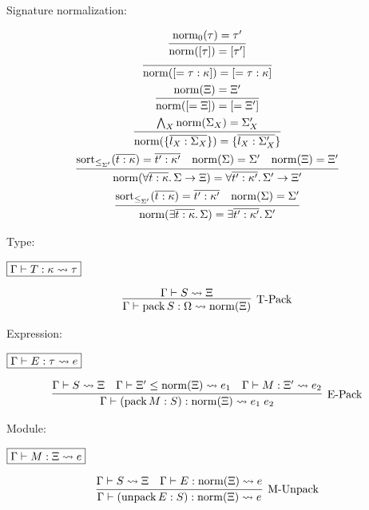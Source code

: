 Signature normalization:

\begin{gather*}
  \infer{\symnorm([\tau]) = [\tau']}{
    \symnorm_0(\tau) = \tau'
  }
  \\
  \infer{\symnorm([= \tau: \kappa]) = [= \tau: \kappa]}{}
  \\
  \infer{\symnorm([= \Xi]) = [= \Xi']}{
    \symnorm(\Xi) = \Xi'
  }
  \\
  \infer{\symnorm(\{\overline{l_X: \Sigma_X}\}) = \{\overline{l_X: \Sigma_X'}\}}{
    \bigwedge_X \symnorm(\Sigma_X) = \Sigma_X'
  }
  \\
  \infer{\symnorm(\forall \overline{t: \kappa}\ldotp \Sigma \to \Xi) = \forall \overline{t': \kappa'}\ldotp \Sigma' \to \Xi'}{
    \symsort_{\leq_{\Sigma'}}(\overline{t: \kappa}) = \overline{t': \kappa'}
    &
    \symnorm(\Sigma) = \Sigma'
    &
    \symnorm(\Xi) = \Xi'
  }
  \\
  \infer{\symnorm(\exists \overline{t: \kappa}\ldotp \Sigma) = \exists \overline{t': \kappa'}\ldotp \Sigma'}{
    \symsort_{\leq_{\Sigma'}}(\overline{t: \kappa}) = \overline{t': \kappa'}
    &
    \symnorm(\Sigma) = \Sigma'
  }
\end{gather*}

Type:

$\fbox{$\Gamma \vdash T: \kappa \rightsquigarrow \tau$}$

\begin{gather*}
  \infer[\text{T-Pack}]{\Gamma \vdash \sympack S: \Omega \elaborate \symnorm(\Xi)}{
    \Gamma \vdash S \elaborate \Xi
  }
\end{gather*}

Expression:

$\fbox{$\Gamma \vdash E: \tau \rightsquigarrow e$}$

\begin{gather*}
  \infer[\text{E-Pack}]{\Gamma \vdash (\sympack M: S): \symnorm(\Xi) \elaborate e_1\; e_2}{
    \Gamma \vdash S \elaborate \Xi
    &
    \Gamma \vdash \Xi' \leq \symnorm(\Xi) \elaborate e_1
    &
    \Gamma \vdash M: \Xi' \elaborate e_2
  }
\end{gather*}

Module:

$\fbox{$\Gamma \vdash M: \Xi \rightsquigarrow e$}$

\begin{gather*}
  \infer[\text{M-Unpack}]{\Gamma \vdash (\symunpack E: S): \symnorm(\Xi) \elaborate e}{
    \Gamma \vdash S \elaborate \Xi
    &
    \Gamma \vdash E: \symnorm(\Xi) \elaborate e
  }
\end{gather*}

